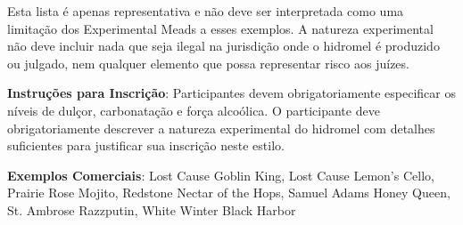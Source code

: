 Esta lista é apenas representativa e não deve ser interpretada como uma limitação dos Experimental Meads a esses exemplos. A natureza experimental não deve incluir nada que seja ilegal na jurisdição onde o hidromel é produzido ou julgado, nem qualquer elemento que possa representar risco aos juízes.

\textbf{Instruções para Inscrição}: Participantes devem obrigatoriamente especificar os níveis de dulçor, carbonatação e força alcoólica. O participante deve obrigatoriamente descrever a natureza experimental do hidromel com detalhes suficientes para justificar sua inscrição neste estilo.

\textbf{Exemplos Comerciais}: Lost Cause Goblin King, Lost Cause Lemon's Cello, Prairie Rose Mojito, Redstone Nectar of the Hops, Samuel Adams Honey Queen, St. Ambrose Razzputin, White Winter Black Harbor